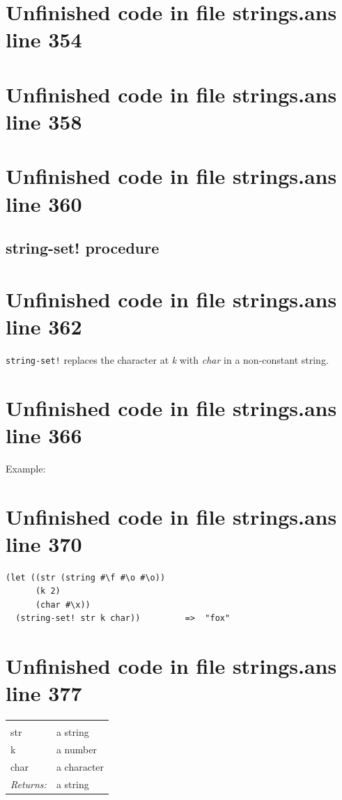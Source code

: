 \documentclass[twoside,9pt]{report}
\begin{document}
\section{Unfinished code in file strings.ans line 354}
\section{Unfinished code in file strings.ans line 358}
\section{Unfinished code in file strings.ans line 360}
\subsection{string-set! procedure}
\label{string-set"!-procedure}
\section{Unfinished code in file strings.ans line 362}


\texttt{string-set!} replaces the character at \emph{k} with \emph{char} in a non-constant string.

\section{Unfinished code in file strings.ans line 366}


Example:

\section{Unfinished code in file strings.ans line 370}
\begin{verbatim}
(let ((str (string #\f #\o #\o))
      (k 2)
      (char #\x))
  (string-set! str k char))         =>  "fox"
\end{verbatim}
\section{Unfinished code in file strings.ans line 377}
\noindent\begin{tabular}{ |p{1.9cm} p{8cm}| }
\hline
\rowcolor[HTML]{CCCCCC} \multicolumn{2}{|l|}{\bf string-set! (public)} \\
str & a string \\
k & a number \\
char & a character \\
\textit{Returns:} & a string \\
\hline
\end{tabular}
\end{document}
